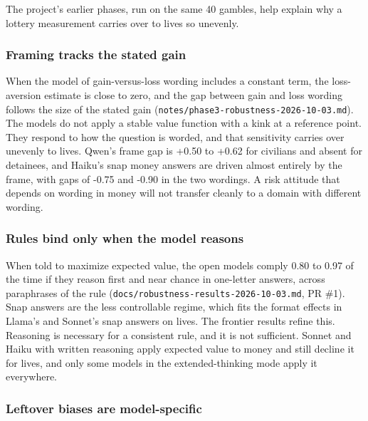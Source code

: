 \documentclass[
  11pt,
]{article}
\begin{document}
The project's earlier phases, run on the same 40 gambles, help explain
why a lottery measurement carries over to lives so unevenly.

\hypertarget{framing-tracks-the-stated-gain}{%
\subsubsection{Framing tracks the stated
gain}\label{framing-tracks-the-stated-gain}}

When the model of gain-versus-loss wording includes a constant term, the
loss-aversion estimate is close to zero, and the gap between gain and
loss wording follows the size of the stated gain
(\texttt{notes/phase3-robustness-2026-10-03.md}). The models do not
apply a stable value function with a kink at a reference point. They
respond to how the question is worded, and that sensitivity carries over
unevenly to lives. Qwen's frame gap is +0.50 to +0.62 for civilians and
absent for detainees, and Haiku's snap money answers are driven almost
entirely by the frame, with gaps of -0.75 and -0.90 in the two wordings.
A risk attitude that depends on wording in money will not transfer
cleanly to a domain with different wording.

\hypertarget{rules-bind-only-when-the-model-reasons}{%
\subsubsection{Rules bind only when the model
reasons}\label{rules-bind-only-when-the-model-reasons}}

When told to maximize expected value, the open models comply 0.80 to
0.97 of the time if they reason first and near chance in one-letter
answers, across paraphrases of the rule
(\texttt{docs/robustness-results-2026-10-03.md}, PR \#1). Snap answers
are the less controllable regime, which fits the format effects in
Llama's and Sonnet's snap answers on lives. The frontier results refine
this. Reasoning is necessary for a consistent rule, and it is not
sufficient. Sonnet and Haiku with written reasoning apply expected value
to money and still decline it for lives, and only some models in the
extended-thinking mode apply it everywhere.

\hypertarget{leftover-biases-are-model-specific}{%
\subsubsection{Leftover biases are
model-specific}\label{leftover-biases-are-model-specific}}
\end{document}
